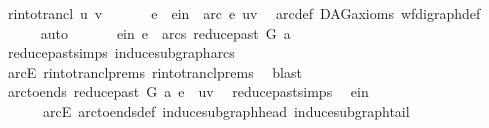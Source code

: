 \begin{isabellebody}
\ {\isacharparenleft}{\kern0pt}r{\isacharunderscore}{\kern0pt}into{\isacharunderscore}{\kern0pt}trancl\ u\ v\ {\isacharparenright}{\kern0pt}\isanewline
\ \ \isamarkupfalse%
\ \isamarkupfalse%
\ e\ \ e{\isacharunderscore}{\kern0pt}in{\isacharcolon}{\kern0pt}\ {\isachardoublequoteopen}\ arc\ e\ {\isacharparenleft}{\kern0pt}u{\isacharcomma}{\kern0pt}v{\isacharparenright}{\kern0pt}{\isachardoublequoteclose}\ \isamarkupfalse%
\ arc{\isacharunderscore}{\kern0pt}def\ DAG{\isacharunderscore}{\kern0pt}axioms\ wf{\isacharunderscore}{\kern0pt}digraph{\isacharunderscore}{\kern0pt}def\isanewline
\ \ \ \ \isamarkupfalse%
\ auto\ \isanewline
\ \ \isamarkupfalse%
\ \isamarkupfalse%
\ e{\isacharunderscore}{\kern0pt}in{}{\isacharcolon}{\kern0pt}\ {\isachardoublequoteopen}e\ {\isasymin}\ arcs\ {\isacharparenleft}{\kern0pt}reduce{\isacharunderscore}{\kern0pt}past\ G\ a{\isacharparenright}{\kern0pt}{\isachardoublequoteclose}\ \isamarkupfalse%
\ reduce{\isacharunderscore}{\kern0pt}past{\isachardot}{\kern0pt}simps\ induce{\isacharunderscore}{\kern0pt}subgraph{\isacharunderscore}{\kern0pt}arcs\isanewline
\ \ \ \ \isamarkupfalse%
\ arcE\ r{\isacharunderscore}{\kern0pt}into{\isacharunderscore}{\kern0pt}trancl{\isachardot}{\kern0pt}prems{\isacharparenleft}{\kern0pt}{}{\isacharparenright}{\kern0pt}\ r{\isacharunderscore}{\kern0pt}into{\isacharunderscore}{\kern0pt}trancl{\isachardot}{\kern0pt}prems{\isacharparenleft}{\kern0pt}{}{\isacharparenright}{\kern0pt}\ \isamarkupfalse%
\ blast\isanewline
\ \ \isamarkupfalse%
\ \isamarkupfalse%
\ {\isachardoublequoteopen}arc{\isacharunderscore}{\kern0pt}to{\isacharunderscore}{\kern0pt}ends\ {\isacharparenleft}{\kern0pt}reduce{\isacharunderscore}{\kern0pt}past\ G\ a{\isacharparenright}{\kern0pt}\ e\ {\isacharequal}{\kern0pt}\ {\isacharparenleft}{\kern0pt}u{\isacharcomma}{\kern0pt}v{\isacharparenright}{\kern0pt}{\isachardoublequoteclose}\ \isamarkupfalse%
\ reduce{\isacharunderscore}{\kern0pt}past{\isachardot}{\kern0pt}simps\ \isamarkupfalse%
\ e{\isacharunderscore}{\kern0pt}in\isanewline
\ \ \ \ \ \ arcE\ arc{\isacharunderscore}{\kern0pt}to{\isacharunderscore}{\kern0pt}ends{\isacharunderscore}{\kern0pt}def\ induce{\isacharunderscore}{\kern0pt}subgraph{\isacharunderscore}{\kern0pt}head\ induce{\isacharunderscore}{\kern0pt}subgraph{\isacharunderscore}{\kern0pt}tail\isanewline

\end{isabellebody}
